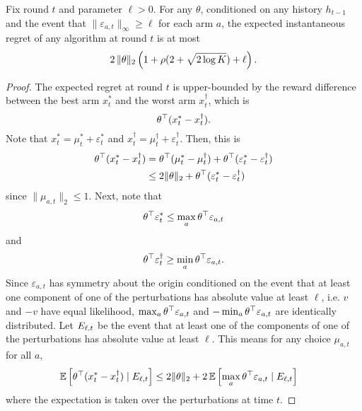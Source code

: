 \begin{lemma}
Fix round $t$ and parameter $\ell>0$. For any $\theta$, conditioned on any history $h_{t-1}$ and the event that
  $\|\varepsilon_{a,t}\|_\infty \ge \ell$
for each arm $a$, the expected instantaneous regret of
  any algorithm at round $t$ is at most
  \[
    2\, \|\theta\|_2\left(1 + \rho(2 + \sqrt{2 \log K}) + \ell\right).
  \]
  \label{lem:exp_reg_ub_er}
\end{lemma}
\begin{proof}
  The expected regret at round $t$ is upper-bounded by the reward difference
  between the best arm $x_t^*$ and the worst arm $x_t^\dagger$, which is
  \[
    \theta^{\top} (x_t^* - x_t^\dagger).
  \]
  Note that $x_t^* = \mu_t^* + \varepsilon_t^*$ and $x_t^\dagger = \mu_t^\dagger
  + \varepsilon_t^\dagger$. Then, this is
  \begin{align*}
    \theta^{\top} (x_t^* - x_t^\dagger) &=
    \theta^{\top} (\mu_t^* - \mu_t^\dagger) + \theta^{\top} (\varepsilon_t^* -
    \varepsilon_t^\dagger) \\
    &\le 2\|\theta\|_2 + \theta^{\top} (\varepsilon_t^* - \varepsilon_t^\dagger)
  \end{align*}
  since $\|\mu_{a,t}\|_2 \le 1$. Next, note that
  \[
    \theta^{\top} \varepsilon_t^* \le \max_a \theta^{\top} \varepsilon_{a,t}
  \]
  and
  \[
    \theta^{\top} \varepsilon_t^\dagger \ge \min_a \theta^{\top} \varepsilon_{a,t}.
  \]
  Since $\varepsilon_{a,t}$ has symmetry about the origin conditioned on the
  event that at least one component of one of the perturbations has absolute
  value at least $\ell$, i.e. $v$ and $-v$ have equal likelihood, $\max_a
  \theta^{\top} \varepsilon_{a,t}$ and $-\min_a \theta^{\top} \varepsilon_{a,t}$ are
  identically distributed. Let $E_{\ell, t}$ be the event that at least one of the
  components of one of the perturbations has absolute value at least $\ell$.
  This means for any choice $\mu_{a,t}$ for all $a$,
  \begin{align*}
    \operatorname{\mathbb{E}} \left[\theta^{\top} (x_t^* - x_t^\dagger) \;|\; E_{\ell, t}\right]
    &\le 2\|\theta\|_2 + 2 \operatorname{\mathbb{E}} \left[\max_a \theta^{\top}
    \varepsilon_{a,t} \;|\; E_{\ell, t}\right]
  \end{align*}
  where the expectation is taken over the perturbations at time $t$.


\end{proof}
